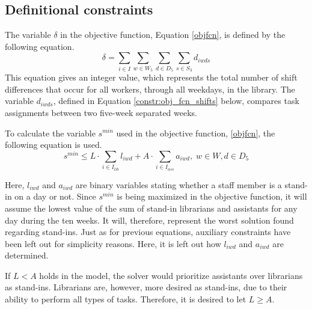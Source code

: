 \subsection{Definitional constraints} \label{section:obj_fcn_constraints}
The variable $\delta$ in the objective function, Equation \ref{objfcn}, is defined by the following equation.
\begin{equation} \label{constr:delta}
\delta = \sum_{i \in I} \sum_{w \in W_5} \sum_{d \in D_5} \sum_{s \in S_3} d_{iwds}
\end{equation}
This equation gives an integer value, which represents the total number of shift differences that occur for all workers, through all weekdays, in the library. The variable $d_{iwds}$, defined in Equation \ref{constr:obj_fcn_shifts} below, compares task assignments between two five-week separated weeks.

To calculate the variable $s^{min}$ used in the objective function, \ref{objfcn}, the following equation is used.
\begin{equation} \label{constr:s_min}
s^{min} \leq L\cdot \sum_{i \in I_{lib}} l_{iwd} + A\cdot \sum_{i \in I_{ass}} a_{iwd}, \;   w \in W, d \in D_5
\end{equation}

Here, $l_{iwd}$ and $a_{iwd}$ are binary variables stating whether a staff member is a stand-in on a day or not. Since $s^{min}$ is being maximized in the objective function, it will assume the lowest value of the sum of stand-in librarians and assistants for any day during the ten weeks. It will, therefore, represent the worst solution found regarding stand-ins. Just as for previous equations, auxiliary constraints have been left out for simplicity reasons. Here, it is left out how $l_{iwd}$ and $a_{iwd}$ are determined.

If $L < A$ holds in the model, the solver would prioritize assistants over librarians as stand-ins. Librarians are, however, more desired as stand-ins, due to their ability to perform all types of tasks. Therefore, it is desired to let $L \geq A$.

